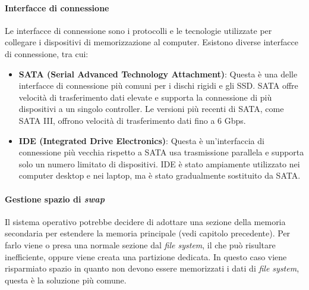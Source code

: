     \paragraph{Interfacce di connessione}
        Le interfacce di connessione sono i protocolli e le tecnologie utilizzate per collegare i dispositivi di memorizzazione al computer. Esistono diverse interfacce di connessione, tra cui:
        \begin{itemize}
            \item \textbf{SATA (Serial Advanced Technology Attachment)}: Questa è una delle interfacce di connessione più comuni per i dischi rigidi e gli SSD. SATA offre velocità di trasferimento dati elevate e supporta la connessione di più dispositivi a un singolo controller. Le versioni più recenti di SATA, come SATA III, offrono velocità di trasferimento dati fino a 6 Gbps.
            \item \textbf{IDE (Integrated Drive Electronics)}: Questa è un'interfaccia di connessione più vecchia rispetto a SATA usa trasmissione parallela e supporta solo un numero limitato di dispositivi. IDE è stato ampiamente utilizzato nei computer desktop e nei laptop, ma è stato gradualmente sostituito da SATA.
        \end{itemize}
    \paragraph{Gestione spazio di \textit{swap}}
        Il sistema operativo potrebbe decidere di adottare una sezione della memoria secondaria per estendere la memoria principale (vedi capitolo precedente). Per farlo viene o presa una normale sezione dal \textit{file system}, il che può risultare inefficiente, oppure viene creata una partizione dedicata. In questo caso viene risparmiato spazio in quanto non devono essere memorizzati i dati di \textit{file system}, questa è la soluzione più comune. 